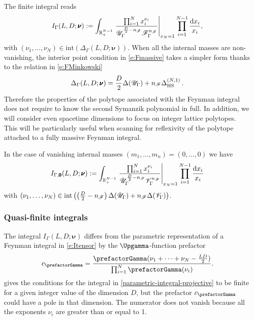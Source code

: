 \documentclass[12pt,a4paper]{article}
\theoremstyle{plain}
\theoremstyle{remark}
\newcommand{\nprops}{N}
\newcommand{\dd}{\mathrm{d}}
\newcommand{\cU}{\mathscr {U}}
\newcommand{\cF}{\mathscr {F}}
\newcommand{\cV}{\mathscr {V}}
\newcommand{\undernotation}[1]{\pmb{#1}}
\newcommand{\Newton}{\Delta}
\newcommand{\simplexwithpars}[1]{\Newton_{\text{HS}}^{(#1)}}
\begin{document}
     The finite integral reads
		\begin{equation}\label{e:Fmassive}
			I_\Gamma(L, D;\undernotation{\nu}):=
                        \int_{\mathbb R_+^{\nprops-1}}
		\left.	{ \prod_{i=1}^\nprops x_i^{\nu_i}\over \cU_\Gamma^{{D\over2}-n_\cF}
				\cF_\Gamma^{n_\cF}}\right|_{x_\nprops=1} \prod_{i=1}^{\nprops-1} {\dd x_i\over x_i}, 
		\end{equation}
with $(\nu_1,\dots,\nu_\nprops)  \in
\textrm{int}\left(\Newton_\Gamma(L,D;\undernotation{\nu})\right)$. 
		When all  the internal masses are non-vanishing, the interior point
		condition in \cref{e:Fmassive} takes a simpler form
                thanks to the relation in \cref{e:FMinkowski}
		\begin{equation}
		\Newton_\Gamma(L,D;\undernotation{\nu})= {D\over2}\Newton(\cU_\Gamma)+n_\cF \simplexwithpars{\nprops,1}\,.
		\end{equation}
        Therefore the properties of the polytope associated with the Feynman
		integral does not require to know the second Symanzik
		polynomial in full. 
        In addition, we will consider even spacetime dimensions to focus on integer lattice polytopes.        This will be particularly useful when scanning for
		reflexivity of the polytope attached to a fully massive Feynman integral.
		
		
		
		In the case of vanishing  internal masses
		$(m_1,\dots,m_n)=(0,\dots,0)$ we have
		\begin{equation}\label{e:Fmassless}
			 I_{\Gamma,\undernotation 0} (L, D;\undernotation{\nu}):=  \int_{\mathbb R_+^{\nprops-1}} \left.
			{ \prod_{i=1}^\nprops x_i^{\nu_i}\over \cU_\Gamma^{{D\over2}-n_\cF}
				\cV_\Gamma^{n_\cF}}\right|_{x_\nprops=1} \prod_{i=1}^{\nprops-1} {\dd x_i\over x_i}
        \end{equation}
with $(\nu_1,\dots,\nu_\nprops)  \in  \textrm{int}\left(\left({D\over2}-n_\cF\right)\Newton(\cU_\Gamma)+n_\cF \Newton(\cV_\Gamma)\right)$. 
                
		\subsubsection{Quasi-finite integrals}\label{sec:quasifinite}
		The integral $I_\Gamma(L, D; \undernotation{\nu})$ differs from the
		parametric representation of a Feynman integral in \cref{e:Itensor} by the $\Upgamma$-function prefactor
		\begin{equation}
			c_\prefactorGamma=
			{\prefactorGamma(\nu_1+\cdots+\nu_\nprops-{LD\over2})\over \prod_{
					i=1}^\nprops\prefactorGamma(\nu_i)}.
		\end{equation}
		 gives the conditions  for the integral
                in \cref{parametric-integral-projective} to be finite
                for a given integer value of the dimension $D$, 
		but the prefactor $c_\prefactorGamma$ could have a pole in that
                dimension. The numerator does not vanish because all
                the exponents $\nu_i$ are greater than or equal to 1.
                
\end{document}

